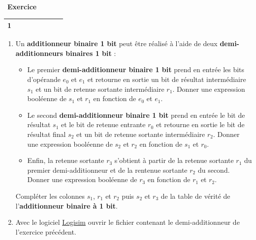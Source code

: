 \documentclass[
  11pt,
]{article}
\providecommand{\tightlist}{%
  \setlength{\itemsep}{0pt}\setlength{\parskip}{0pt}}
\newcounter{exo}
\newenvironment{exercice}[1]
{\par \medskip   \addtocounter{exo}{1} \noindent  
\begin{bclogo}[arrondi =0.1,   noborder = true, logo=\bccrayon, marge=4]{~\textbf{Exercice} \textbf{\theexo} {\itshape #1} }  \par}
{
\end{bclogo}
 \par \bigskip }
\newcounter{def}
\newcounter{logi}
\begin{document}
\begin{exercice}{}
\begin{longtable}[]{@{}clllllll@{}}
\begin{minipage}[t]{0.05\columnwidth}
1\strut
\end{minipage} & \begin{minipage}[t]{0.14\columnwidth}\raggedright
\strut
\end{minipage} & \begin{minipage}[t]{0.12\columnwidth}\raggedright
\strut
\end{minipage} & \begin{minipage}[t]{0.14\columnwidth}\raggedright
\strut
\end{minipage} & \begin{minipage}[t]{0.12\columnwidth}\raggedright
\strut
\end{minipage} & \begin{minipage}[t]{0.12\columnwidth}\raggedright
\strut
\end{minipage}\tabularnewline
\bottomrule
\end{longtable}

\begin{enumerate}
\def\labelenumi{\arabic{enumi}.}
\setcounter{enumi}{1}
\item
  Un \textbf{additionneur binaire 1 bit} peut être réalisé à l'aide de
  deux \textbf{demi-additionneurs binaires 1 bit} :

  \begin{itemize}
  \tightlist
  \item
    Le premier \textbf{demi-additionneur binaire 1 bit} prend en entrée
    les bits d'opérande \(e_{0}\) et \(e_{1}\) et retourne en sortie un
    bit de résultat intermédiaire \(s_{1}\) et un bit de retenue
    sortante intermédiaire \(r_{1}\). Donner une expression booléenne de
    \(s_{1}\) et \(r_{1}\) en fonction de \(e_{0}\) et \(e_{1}\).
  \item
    Le second \textbf{demi-additionneur binaire 1 bit} prend en entrée
    le bit de résultat \(s_{1}\) et le bit de retenue entrante \(r_{0}\)
    et retourne en sortie le bit de résultat final \(s_{2}\) et un bit
    de retenue sortante intermédiaire \(r_{2}\). Donner une expression
    booléenne de \(s_{2}\) et \(r_{2}\) en fonction de \(s_{1}\) et
    \(r_{0}\).
  \item
    Enfin, la retenue sortante \(r_{3}\) s'obtient à partir de la
    retenue sortante \(r_{1}\) du premier demi-additionneur et de la
    rentenue sortante \(r_{2}\) du second. Donner une expression
    booléenne de \(r_{3}\) en fonction de \(r_{1}\) et \(r_{2}\).
  \end{itemize}

  Compléter les colonnes \(s_{1}\), \(r_{1}\) et \(r_{2}\) puis
  \(s_{2}\) et \(r_{3}\) de la table de vérité de l'\textbf{additionneur
  binaire à 1 bit}.
\item
  Avec le logiciel \href{http://www.cburch.com/logisim/}{Logisim} ouvrir
  le fichier contenant le demi-additionneur de l'exercice précédent.


\end{enumerate}
\end{exercice}
\end{document}
